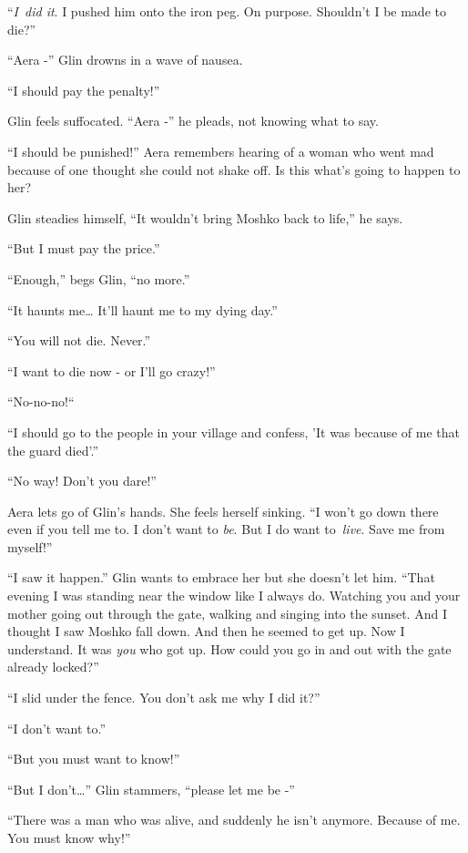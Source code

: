 \documentclass[twoside,11pt]{book}
\begin{document}
``\textit{I}\ \textit{did it}. I pushed him onto the iron peg. On purpose. Shouldn't I be made to
die?'' 

``Aera -'' Glin drowns in a wave of nausea. 

``I should pay the penalty!''

Glin feels suffocated. ``Aera -'' he pleads, not knowing what to say. 

``I should be punished!'' Aera remembers hearing of a woman who went mad because of one
thought she could not shake off. Is this what's going to happen to her? 

Glin steadies himself, ``It wouldn't bring Moshko back to life,'' he says. 

``But I must pay the price.'' 

``Enough,'' begs Glin, ``no more.'' 

``It haunts me{\dots} It'll haunt me to my dying day.'' 

``You will not die. Never.'' 

``I want to die now - or I'll go crazy!'' 

``No-no-no!``~ 

``I should go to the people in your village and confess, 'It was because of me that the guard
died'.'' 

``No way! Don't you dare!'' ~~~~~~~~~~~~~~~~~~~~~~~~~~~~~~~~~~~~~~~~~~~~ 

Aera lets go of Glin's hands. She feels herself sinking. ``I won't go down there even if you tell me to. I
don't want to \textit{be}. But I do want to\ \textit{live}. Save me from myself!'' 

``I saw it happen.'' Glin wants to embrace her but she doesn't let him. ``That
evening I was standing near the window like I always do. Watching you and your mother going out through the gate,
walking and singing into the sunset. And I thought I saw Moshko fall down. And then he seemed to get up. Now I
understand. It was \textit{you} who got up. How could you go in and out with the gate already locked?'' 

``I slid under the fence. You don't ask me why I did it?'' 

``I don't want to.'' 

``But you must want to know!'' 

``But I don't{\dots}'' Glin stammers, ``please let me be -'' 

``There was a man who was alive, and suddenly he isn't anymore. Because of me. You must know
why!'' 
\end{document}
